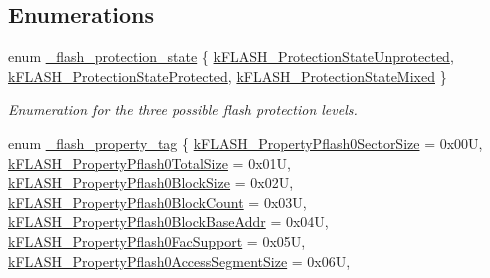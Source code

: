 \subsection*{Enumerations}
\begin{DoxyCompactItemize}
\item 
enum \mbox{\hyperlink{group__ftfx__flash__driver_gaa57200417aa53aa9cd19535f69b5c964}{\+\_\+flash\+\_\+protection\+\_\+state}} \{ \mbox{\hyperlink{group__ftfx__flash__driver_ggaa57200417aa53aa9cd19535f69b5c964ace4690203221c04a4e00de6278a59f1e}{k\+F\+L\+A\+S\+H\+\_\+\+Protection\+State\+Unprotected}}, 
\mbox{\hyperlink{group__ftfx__flash__driver_ggaa57200417aa53aa9cd19535f69b5c964a2c73fefaf7e6e3a065744be1aab71149}{k\+F\+L\+A\+S\+H\+\_\+\+Protection\+State\+Protected}}, 
\mbox{\hyperlink{group__ftfx__flash__driver_ggaa57200417aa53aa9cd19535f69b5c964aca2ca63f9c507495e7b0f510b69497bb}{k\+F\+L\+A\+S\+H\+\_\+\+Protection\+State\+Mixed}}
 \}
\begin{DoxyCompactList}\small\item\em Enumeration for the three possible flash protection levels. \end{DoxyCompactList}\item 
enum \mbox{\hyperlink{group__ftfx__flash__driver_gab58c8e11c7236162806360885b462391}{\+\_\+flash\+\_\+property\+\_\+tag}} \{ \newline
\mbox{\hyperlink{group__ftfx__flash__driver_ggab58c8e11c7236162806360885b462391ad5278bc0b7840b03bd9702073715486c}{k\+F\+L\+A\+S\+H\+\_\+\+Property\+Pflash0\+Sector\+Size}} = 0x00U, 
\mbox{\hyperlink{group__ftfx__flash__driver_ggab58c8e11c7236162806360885b462391ac57314c4df9c442003ed97dc99ffc0e5}{k\+F\+L\+A\+S\+H\+\_\+\+Property\+Pflash0\+Total\+Size}} = 0x01U, 
\mbox{\hyperlink{group__ftfx__flash__driver_ggab58c8e11c7236162806360885b462391a899920d2916e778533e35ca95e7028e4}{k\+F\+L\+A\+S\+H\+\_\+\+Property\+Pflash0\+Block\+Size}} = 0x02U, 
\mbox{\hyperlink{group__ftfx__flash__driver_ggab58c8e11c7236162806360885b462391a5b55f40c02f3c20568da44eb8dfeb69c}{k\+F\+L\+A\+S\+H\+\_\+\+Property\+Pflash0\+Block\+Count}} = 0x03U, 
\newline
\mbox{\hyperlink{group__ftfx__flash__driver_ggab58c8e11c7236162806360885b462391a4f8aa328062d9f89676c6351e09ba1d6}{k\+F\+L\+A\+S\+H\+\_\+\+Property\+Pflash0\+Block\+Base\+Addr}} = 0x04U, 
\mbox{\hyperlink{group__ftfx__flash__driver_ggab58c8e11c7236162806360885b462391acc76ef66c7ebdb560b62d0851b2267ac}{k\+F\+L\+A\+S\+H\+\_\+\+Property\+Pflash0\+Fac\+Support}} = 0x05U, 
\mbox{\hyperlink{group__ftfx__flash__driver_ggab58c8e11c7236162806360885b462391a3a5437feb29369402a096c38c214e6da}{k\+F\+L\+A\+S\+H\+\_\+\+Property\+Pflash0\+Access\+Segment\+Size}} = 0x06U, 

\end{DoxyCompactItemize}
